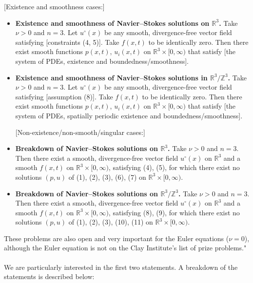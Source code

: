\documentclass[12pt]{article}
\begin{document}
[Existence and smoothness cases:]
\begin{itemize}

    \item[(A)] \textbf{Existence and smoothness of Navier–Stokes solutions on $\mathbb{R}^3$.}  
    Take $\nu > 0$ and $n = 3$. Let $u^\circ(x)$ be any smooth, divergence-free vector field satisfying [constraints (4, 5)].  
    Take $f(x, t)$ to be identically zero. Then there exist smooth functions $p(x, t)$, $u_i(x, t)$  
    on $\mathbb{R}^3 \times [0, \infty)$ that satisfy [the system of PDEs, existence and boundedness/smoothness].

    \item[(B)] \textbf{Existence and smoothness of Navier–Stokes solutions in $\mathbb{R}^3/\mathbb{Z}^3$.}  
    Take $\nu > 0$ and $n = 3$. Let $u^\circ(x)$ be any smooth, divergence-free vector field satisfying [assumption (8)].  
    Take $f(x, t)$ to be identically zero. Then there exist smooth functions $p(x, t)$, $u_i(x, t)$  
    on $\mathbb{R}^3 \times [0, \infty)$ that satisfy [the system of PDEs, spatially periodic existence and boundedness/smoothness].

[Non-existence/non-smooth/singular cases:]
    \item[(C)] \textbf{Breakdown of Navier–Stokes solutions on $\mathbb{R}^3$.}  
    Take $\nu > 0$ and $n = 3$. Then there exist a smooth, divergence-free vector field $u^\circ(x)$ on $\mathbb{R}^3$  
    and a smooth $f(x, t)$ on $\mathbb{R}^3 \times [0, \infty)$, satisfying (4), (5), for which there exist no solutions $(p, u)$  
    of (1), (2), (3), (6), (7) on $\mathbb{R}^3 \times [0, \infty)$.

    \item[(D)] \textbf{Breakdown of Navier–Stokes solutions on $\mathbb{R}^3/\mathbb{Z}^3$.}  
    Take $\nu > 0$ and $n = 3$. Then there exist a smooth, divergence-free vector field $u^\circ(x)$ on $\mathbb{R}^3$  
    and a smooth $f(x, t)$ on $\mathbb{R}^3 \times [0, \infty)$, satisfying (8), (9), for which there exist no solutions $(p, u)$  
    of (1), (2), (3), (10), (11) on $\mathbb{R}^3 \times [0, \infty)$.
\end{itemize}

These problems are also open and very important for the Euler equations ($\nu = 0$), although the Euler equation is not on the Clay Institute’s list of prize problems." \\ \\
We are particularly interested in the first two statements. A breakdown of the statements is described below: \\
\end{document}
